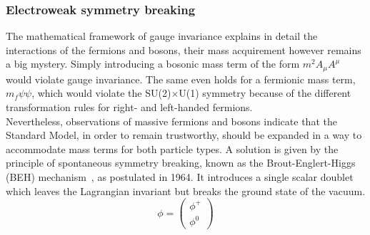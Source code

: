 \subsubsection{Electroweak symmetry breaking} \label{sec::EWSB}
The mathematical framework of gauge invariance explains in detail the interactions of the fermions and bosons, their mass acquirement however remains a big mystery. Simply introducing a bosonic mass term of the form $m^{2} A_{\mu}A^{\mu}$ would violate gauge invariance.
The same even holds for a fermionic mass term, $m_{f} \psi \psi$, which would violate the SU(2)$\times$U(1) symmetry because of the different transformation rules for right- and left-handed fermions.
\\
Nevertheless, observations of massive fermions and bosons indicate that the Standard Model, in order to remain trustworthy, should be expanded in a way to accommodate mass terms for both particle types.
A solution is given by the principle of spontaneous symmetry breaking, known as the Brout-Englert-Higgs (BEH) mechanism~\cite{Englert, Higgs, Kibble}, as postulated in 1964.
It introduces a single scalar doublet which leaves the Lagrangian invariant but breaks the ground state of the vacuum.
\begin{equation}
 \phi = \begin{pmatrix}
            \phi^{+} \\
            \phi^{0}
           \end{pmatrix}
\end{equation}
